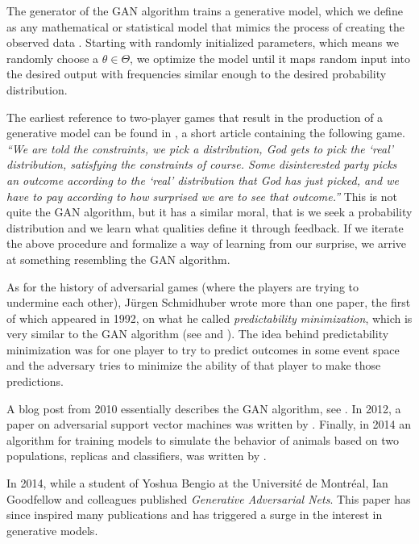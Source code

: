 The generator of the GAN algorithm trains a generative model, which we
define as any mathematical or statistical model that mimics the
process of creating the observed data \cite{ref:bishop}. Starting with
randomly initialized parameters, which means we randomly choose a
$\theta \in \Theta$, we optimize the model until it maps random input
into the desired output with frequencies similar enough to the desired
probability distribution.

The earliest reference to two-player games that result in the
production of a generative model can be found in \cite{ref:doyle}, a
short article containing the following game. \textit{``We are told the
constraints, we pick a distribution, God gets to pick the `real'
distribution, satisfying the constraints of course. Some disinterested
party picks an outcome according to the `real' distribution that God
has just picked, and we have to pay according to how surprised we are
to see that outcome.''} This is not quite the GAN algorithm, but it
has a similar moral, that is we seek a probability distribution and we
learn what qualities define it through feedback. If we iterate the
above procedure and formalize a way of learning from our surprise, we
arrive at something resembling the GAN algorithm.

As for the history of adversarial games (where the players are trying
to undermine each other), J\"{u}rgen Schmidhuber wrote more than one
paper, the first of which appeared in 1992, on what he called
\textit{predictability minimization}, which is very similar to the GAN
algorithm (see \cite{ref:schmidhuber-1992} and
\cite{ref:schmidhuber-2018}). The idea behind predictability
minimization was for one player to try to predict outcomes in some
event space and the adversary tries to minimize the ability of that
player to make those predictions.

A blog post from 2010 essentially describes the GAN algorithm, see
\cite{ref:niemitalo-2010}. In 2012, a paper on adversarial support
vector machines was written by \cite{ref:zhou-2012}. Finally, in 2014
an algorithm for training models to simulate the behavior of animals
based on two populations, replicas and classifiers, was written by
\cite{ref:li-2014}.

In 2014, while a student of Yoshua Bengio at the Universit\'{e} de
Montr\'{e}al, Ian Goodfellow and colleagues published
\textit{Generative Adversarial Nets}.  This paper has since inspired
many publications and has triggered a surge in the interest in
generative models.

